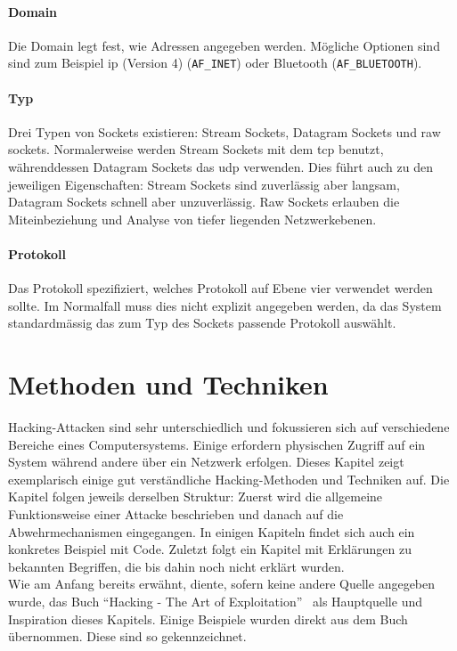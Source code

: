\documentclass[11pt, a4paper]{article}
\begin{document}
\paragraph{Domain}
Die Domain legt fest, wie Adressen angegeben werden. Mögliche Optionen sind sind zum Beispiel \gls{ip} (Version 4) (\texttt{AF\_INET}) oder Bluetooth (\texttt{AF\_BLUETOOTH}).
\paragraph{Typ}
Drei Typen von Sockets existieren: Stream Sockets, Datagram Sockets und raw sockets. Normalerweise werden Stream Sockets mit dem \gls{tcp} benutzt, währenddessen Datagram Sockets das \gls{udp} verwenden. Dies führt auch zu den jeweiligen Eigenschaften: Stream Sockets sind zuverlässig aber langsam, Datagram Sockets schnell aber unzuverlässig. Raw Sockets erlauben die Miteinbeziehung und Analyse von tiefer liegenden Netzwerkebenen. 
\paragraph{Protokoll}
Das Protokoll spezifiziert, welches Protokoll auf Ebene vier verwendet werden sollte. Im Normalfall muss dies nicht explizit angegeben werden, da das System standardmässig das zum Typ des Sockets passende Protokoll auswählt.


\newpage
\section{Methoden und Techniken}\label{sec:methoden-und-techniken}
Hacking-Attacken sind sehr unterschiedlich und fokussieren sich auf verschiedene Bereiche eines Computersystems. Einige erfordern physischen Zugriff auf ein System während andere über ein Netzwerk erfolgen. Dieses Kapitel zeigt exemplarisch einige gut verständliche Hacking-Methoden und Techniken auf. Die Kapitel folgen jeweils derselben Struktur: Zuerst wird die allgemeine Funktionsweise einer Attacke beschrieben und danach auf die Abwehrmechanismen eingegangen. In einigen Kapiteln findet sich auch ein konkretes Beispiel mit Code. Zuletzt folgt ein Kapitel mit Erklärungen zu bekannten Begriffen, die bis dahin noch nicht erklärt wurden. \\Wie am Anfang bereits erwähnt, diente, sofern keine andere Quelle angegeben wurde, das Buch ``Hacking - The Art of Exploitation''~\cite{erickson2008hacking} als Hauptquelle und Inspiration dieses Kapitels. Einige Beispiele wurden direkt aus dem Buch übernommen. Diese sind so gekennzeichnet.
\end{document}
